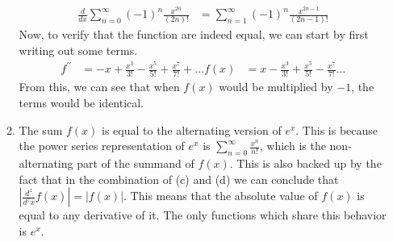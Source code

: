 \documentclass{article}
\begin{document}
\begin{enumerate}[label=\textbf{(14.\arabic*)}]
\begin{enumerate}
    \begin{align*}
    \frac{d}{dx}\sum_{n=0}^\infty (-1)^n\frac{x^{2n}}{(2n)!} &= \sum_{n=1}^\infty (-1)^n\frac{x^{2n-1}}{(2n-1)!}
    \end{align*}
    Now, to verify that the function are indeed equal, we can start by first writing out some terms. 
    \begin{align*}
    f^{\prime\prime} &= -x+\frac{x^3}{3!}-\frac{x^5}{5!}+\frac{x^7}{7!}+\ldots
    f(x) &= x-\frac{x^3}{3!}+\frac{x^5}{5!}-\frac{x^7}{7!}\ldots
    \end{align*}
    From this, we can see that when $f(x)$ would be multiplied by $-1$, the terms would be identical. 
    \item The sum $f(x)$ is equal to the alternating version of $e^x$. This is because the  power series representation of $e^x$ is $\sum_{n=0}^\infty \frac{x^n}{n!}$, which is the non-alternating part of the summand of $f(x)$. This is also backed up by the fact that in the combination of (c) and (d) we can conclude that $\left|\frac{d^z}{d^zx}f(x)\right|=|f(x)|$. This means that the absolute value of $f(x)$ is equal to any derivative of it. The only functions which share this behavior is $e^x$. 
\end{enumerate}


\end{enumerate}
\end{document}
